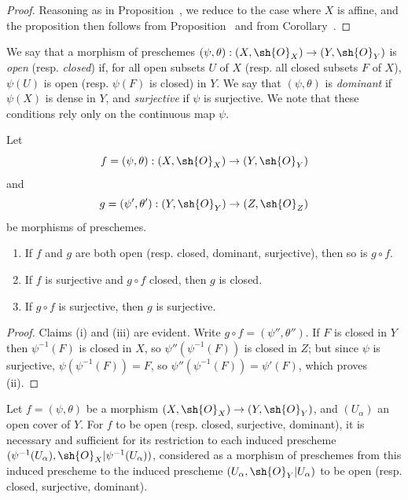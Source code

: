 \begin{proof}
Reasoning as in Proposition~, we reduce to the case where $X$ is affine, and the proposition then follows from Proposition~ and from Corollary~.
\end{proof}

\begin{env}[2.2.6]
\label{I.2.2.6}
We say that a morphism of preschemes $(\psi,\theta):(X,\sh{O}_X)\to(Y,\sh{O}_Y)$ is \emph{open} (resp. \emph{closed}) if, for all open subsets $U$ of $X$ (resp. all closed subsets $F$ of $X$), $\psi(U)$ is open (resp. $\psi(F)$ is closed) in $Y$.
We say that $(\psi,\theta)$ is \emph{dominant} if $\psi(X)$ is dense in $Y$, and \emph{surjective} if $\psi$ is surjective.
We note that these conditions rely only on the continuous map $\psi$.
\end{env}

\begin{proposition}[2.2.7]
\label{I.2.2.7}
Let
\[
  f=(\psi,\theta):(X,\sh{O}_X)\to(Y,\sh{O}_Y)
\]
and
\[
  g=(\psi',\theta'):(Y,\sh{O}_Y)\to(Z,\sh{O}_Z)
\]
be morphisms of preschemes.
\begin{enumerate}
  \item[{\rm(i)}] If $f$ and $g$ are both open (resp. closed, dominant, surjective),
    then so is $g\circ f$.
  \item[{\rm(ii)}] If $f$ is surjective and $g\circ f$ closed, then $g$ is closed.
  \item[{\rm(iii)}] If $g\circ f$ is surjective, then $g$ is surjective.
\end{enumerate}
\end{proposition}

\begin{proof}
Claims (i) and (iii) are evident.
Write $g\circ f=(\psi'',\theta'')$.
If $F$ is closed in $Y$ then $\psi^{-1}(F)$ is closed in $X$, so $\psi''(\psi^{-1}(F))$ is closed in $Z$;
but since $\psi$ is surjective, $\psi(\psi^{-1}(F))=F$, so $\psi''(\psi^{-1}(F))=\psi'(F)$, which proves (ii).
\end{proof}

\begin{proposition}[2.2.8]
\label{I.2.2.8}
Let $f=(\psi,\theta)$ be a morphism $(X,\sh{O}_X)\to(Y,\sh{O}_Y)$, and $(U_\alpha)$ an open cover of $Y$.
For $f$ to be open (resp. closed, surjective, dominant), it is necessary and sufficient for its restriction to each induced prescheme $(\psi^{-1}(U_\alpha),\sh{O}_X|\psi^{-1}(U_\alpha))$, considered as a morphism of preschemes from this induced prescheme to the induced prescheme $(U_\alpha,\sh{O}_Y|U_\alpha)$ to be open (resp. closed, surjective, dominant).
\end{proposition}


